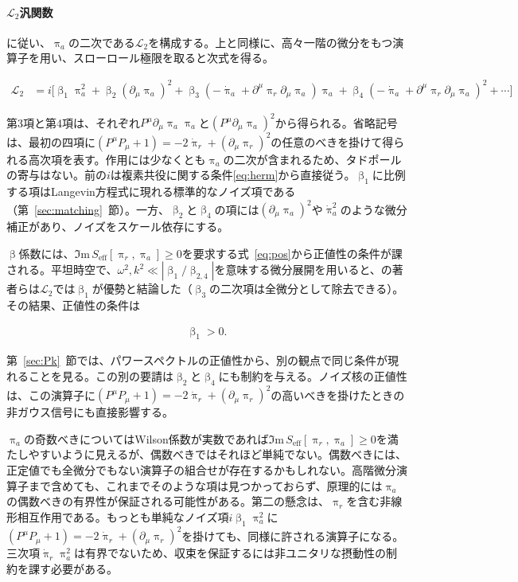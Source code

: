 \documentclass[a4paper,11pt]{ltjsarticle}
\numberwithin{equation}{section}
\newcommand{\Ima}{\Im \mathrm{m}\,}
\newcommand{\Eq}[1]{Eq.~(\ref{#1})}
\newcommand{\Sec}[1]{Sec.~\ref{#1}}
\renewcommand{\Eq}[1]{式~\eqref{#1}}
\renewcommand{\Sec}[1]{第~\ref{#1}~節}
\begin{document}
\paragraph{$\mathcal{L}_2$汎関数}

\cite{Hongo:2018ant}に従い、$\uppi_a$の二次である$\mathcal{L}_2$を構成する。上と同様に、高々一階の微分をもつ演算子を用い、スローロール極限を取ると次式を得る。

\begin{align}\label{eq:diffquad}
    \mathcal{L}_2 &= i \Big[\upbeta_1 \uppi_{a}^2 + \upbeta_2 \left( \partial_\mu \uppi_{a}\right)^2 +\upbeta_3 \left(-\dot{\uppi}_{a} + \partial^\mu \uppi_{r} \partial_\mu \uppi_{a}\right)\uppi_{a} +\upbeta_4 \left(-\dot{\uppi}_{a} + \partial^\mu \uppi_{r} \partial_\mu \uppi_{a}\right)^2 + \cdots \Big]
\end{align}

第3項と第4項は、それぞれ$P^\mu\partial_\mu\uppi_a\uppi_a$と$(P^\mu\partial_\mu\uppi_a)^2$から得られる。省略記号は、最初の四項に$(P^\mu P_\mu+1)=-2\dot{\uppi}_r+(\partial_\mu\uppi_r)^2$の任意のべきを掛けて得られる高次項を表す。作用には少なくとも$\uppi_a$の二次が含まれるため、タドポールの寄与はない。前の$i$は複素共役に関する条件\eqref{eq:herm}から直接従う。$\upbeta_1$に比例する項はLangevin方程式に現れる標準的なノイズ項である（\Sec{sec:matching}）。一方、$\upbeta_2$と$\upbeta_4$の項には$(\partial_\mu\uppi_a)^2$や$\dot{\uppi}_a^2$のような微分補正があり、ノイズをスケール依存にする。

$\upbeta$係数には、$\Ima S_{\mathrm{eff}}[\uppi_r,\uppi_a]\geq0$を要求する\Eq{eq:pos}から正値性の条件が課される。平坦時空で、$\omega^2,k^2\ll|\upbeta_1/\upbeta_{2,4}|$を意味する微分展開を用いると、\cite{Hongo:2018ant}の著者らは$\mathcal{L}_2$では$\upbeta_1$が優勢と結論した（$\upbeta_3$の二次項は全微分として除去できる）。その結果、正値性の条件は

\begin{align}
    \upbeta_1 > 0.
\end{align}

\Sec{sec:Pk}では、パワースペクトルの正値性から、別の観点で同じ条件が現れることを見る。この別の要請は$\upbeta_2$と$\upbeta_4$にも制約を与える。ノイズ核の正値性は、この演算子に$(P^\mu P_\mu+1)=-2\dot{\uppi}_r+(\partial_\mu\uppi_r)^2$の高いべきを掛けたときの非ガウス信号にも直接影響する。

$\uppi_a$の奇数べきについてはWilson係数が実数であれば$\Ima S_{\mathrm{eff}}[\uppi_r,\uppi_a]\geq0$を満たしやすいように見えるが、偶数べきではそれほど単純でない。偶数べきには、正定値でも全微分でもない演算子の組合せが存在するかもしれない。高階微分演算子まで含めても、これまでそのような項は見つかっておらず、原理的には$\uppi_a$の偶数べきの有界性が保証される可能性がある。第二の懸念は、$\uppi_r$を含む非線形相互作用である。もっとも単純なノイズ項$i\upbeta_1\uppi_a^2$に$(P^\mu P_\mu+1)=-2\dot{\uppi}_r+(\partial_\mu\uppi_r)^2$を掛けても、同様に許される演算子になる。三次項$\dot{\uppi}_r\uppi_a^2$は有界でないため、収束を保証するには非ユニタリな摂動性の制約を課す必要がある。
\end{document}
